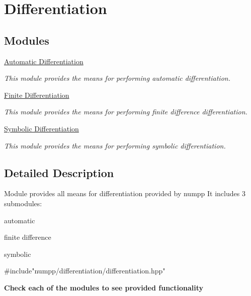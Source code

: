 \hypertarget{group__numpp__differentiation}{}\section{Differentiation}
\label{group__numpp__differentiation}
\subsection*{Modules}
\begin{DoxyCompactItemize}
\item 
\hyperlink{group__numpp__differentiation__automatic}{Automatic Differentiation}
\begin{DoxyCompactList}\small\item\em This module provides the means for performing automatic differentiation. \end{DoxyCompactList}\item 
\hyperlink{group__numpp__differentiation__finite}{Finite Differentiation}
\begin{DoxyCompactList}\small\item\em This module provides the means for performing finite difference differentiation. \end{DoxyCompactList}\item 
\hyperlink{group__numpp__differentiation__symbolic}{Symbolic Differentiation}
\begin{DoxyCompactList}\small\item\em This module provides the means for performing symbolic differentiation. \end{DoxyCompactList}\end{DoxyCompactItemize}


\subsection{Detailed Description}
Module provides all means for differentiation provided by numpp It includes 3 submodules\+:
\begin{DoxyItemize}
\item automatic
\item finite difference
\item symbolic
\end{DoxyItemize}


\begin{DoxyCode}
\textcolor{preprocessor}{#include"numpp/differentiation/differentiation.hpp"}
\end{DoxyCode}


{\bfseries Check each of the modules to see provided functionality} 